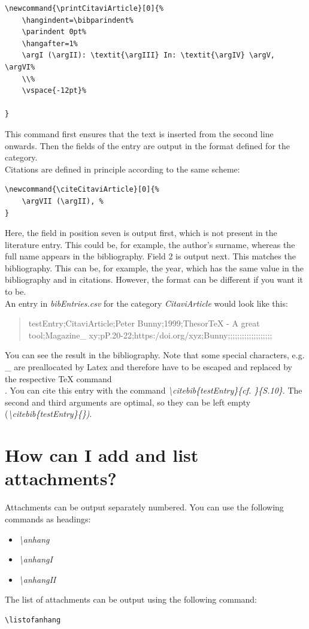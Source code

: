\documentclass[12pt]{article}
\begin{document}
\begin{lstlisting}
\newcommand{\printCitaviArticle}[0]{%
    \hangindent=\bibparindent%
    \parindent 0pt%
    \hangafter=1%
    \argI (\argII): \textit{\argIII} In: \textit{\argIV} \argV, \argVI%
    \\%
    \vspace{-12pt}%

}
\end{lstlisting}
This command first ensures that the text is inserted from the second line onwards. Then the fields of the entry are output in the format defined for the category.\\
Citations are defined in principle according to the same scheme:
\begin{lstlisting}
\newcommand{\citeCitaviArticle}[0]{%
    \argVII (\argII), %
}
\end{lstlisting}
Here, the field in position seven is output first, which is not present in the literature entry. This could be, for example, the author's surname, whereas the full name appears in the bibliography. Field 2 is output next. This matches the bibliography. This can be, for example, the year, which has the same value in the bibliography and in citations. However, the format can be different if you want it to be.\\
An entry in \textit{bibEntries.csv} for the category \textit{CitaviArticle} would look like this:
\begin{quote}
testEntry;CitaviArticle;Peter Bunny;1999;ThesorTeX - A great tool;Magazine\_ xy;pP.20-22;https:/doi.org/xyz;Bunny;;;;;;;;;;;;;;;;;;;
\end{quote}
You can see the result in the bibliography. Note that some special characters, e.g. \_ are preallocated by Latex and therefore have to be escaped and replaced by the respective TeX command \\.
You can cite this entry with the command \textit{\textbackslash citebib\{testEntry\}\{cf. \}\{S.10\}}. The second and third arguments are optimal, so they can be left empty (\textit{\textbackslash citebib\{testEntry\}\{\})}.

\section{How can I add and list attachments?}
Attachments can be output separately numbered. You can use the following commands as headings:
\begin{itemize}
\item \textit{\textbackslash anhang}
\item \textit{\textbackslash anhangI}
\item \textit{\textbackslash anhangII}
\end{itemize}
The list of attachments can be output using the following command:
\begin{lstlisting}
\listofanhang
\end{lstlisting}
\end{document}
